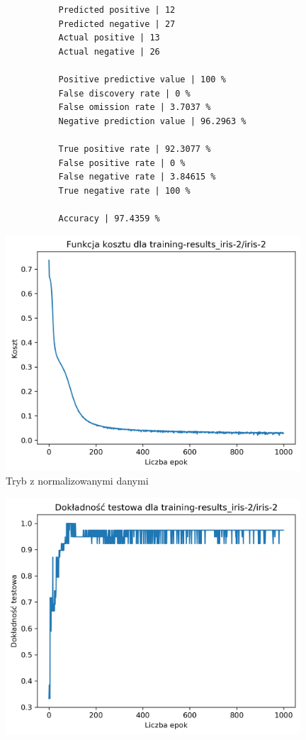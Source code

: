 \documentclass{classrep}
\begin{document}
{{{\begin{lstlisting}
                Predicted positive | 12
                Predicted negative | 27
                Actual positive | 13
                Actual negative | 26

                Positive predictive value | 100 %
                False discovery rate | 0 %
                False omission rate | 3.7037 %
                Negative prediction value | 96.2963 %

                True positive rate | 92.3077 %
                False positive rate | 0 %
                False negative rate | 3.84615 %
                True negative rate | 100 %

                Accuracy | 97.4359 %
                \end{lstlisting}
                \begin{figure}[!htbp]
                    \centering
                    \includegraphics[width=110mm]{wykresy/iris-2_cost.png}
                    \caption{Tryb z normalizowanymi danymi}
                \end{figure}
                \begin{figure}[!htbp]
                    \centering
                    \includegraphics[width=110mm]{wykresy/iris-2_testing-accuracy.png}

\end{figure}}}}
\end{document}
